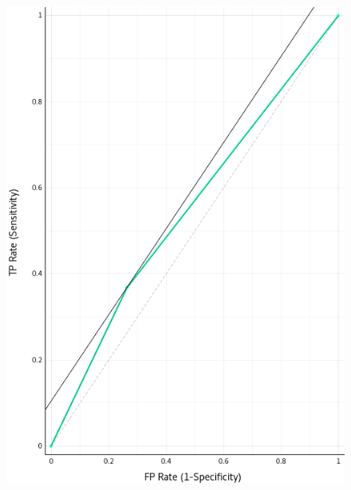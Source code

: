 \begin{figure}[H]
\begin{center}
    \includegraphics{figuras/roc_0-5.png}
\end{center}
\caption{}
\label{fig:class_0.50}
\end{figure}

